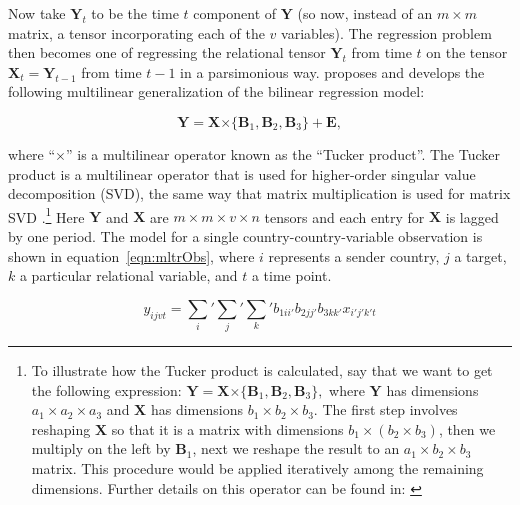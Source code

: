 \documentclass[3p,times,twocolumn,authoryear,12pt]{elsarticle}
\newcommand{\bl}[1]{{\mathbf #1}}
\begin{document}
Now take $\bl Y_t$ to be the time $t$ component of $\bl Y$ (so now, instead of an $m\times m$ matrix, a tensor incorporating each of the $v$ variables). The regression problem then becomes one of regressing the relational tensor $\bl Y_t$ from time $t$ on the tensor $\bl X_t =\bl Y_{t-1}$ from time $t-1$ in a parsimonious way. \citet{hoff:2015} proposes and develops the following multilinear generalization of the bilinear regression model: 

\begin{equation}  
	\bl Y = \bl X \boldsymbol{\times} \{ \bl B_{1}, \bl B_{2}, \bl B_3\} + \bl E ,  
	\label{eqn:mltr}
\end{equation}

\noindent where ``$\boldsymbol{\times}$'' is a multilinear operator known as the ``Tucker product''. The Tucker product is a multilinear operator that is used for higher-order singular value decomposition (SVD), the same way that matrix multiplication is used for matrix SVD \citep{lathauwer:etal:2000, kolda:bader:2009}.\footnote{To illustrate how the Tucker product is calculated, say that we want to get the following expression: $\bl Y = \bl X \boldsymbol{\times} \{ \bl B_{1}, \bl B_{2}, \bl B_{3}\},$ where $\bl Y$ has dimensions $a_{1} \times a_{2} \times a_{3}$ and $\bl X$ has dimensions $b_{1} \times b_{2} \times b_{3}$. The first step involves reshaping $\bl X$ so that it is a matrix with  dimensions $b_{1} \times (b_{2} \times b_{3})$, then we multiply on the left by $\bl B_{1}$, next we reshape the result to an $a_{1} \times b_{2} \times b_{3}$ matrix. This procedure would be applied iteratively among the remaining dimensions. Further details on this operator can be found in: \citet{kolda:2006, hoff:2011}} Here $\bl Y$ and $\bl X$ are $m \times m \times v \times n$ tensors and each entry for $\bl X$ is lagged by one period. The model for a single country-country-variable observation is shown in equation~\ref{eqn:mltrObs}, where $i$ represents a sender country, $j$ a target, $k$ a particular relational variable, and $t$ a time point. 

\begin{equation}  
	y_{ijvt} = \sum_i' \sum_j' \sum_k' b_{1ii'} b_{2jj'} b_{3kk'} x_{i'j'k't}
	\label{eqn:mltrObs}
\end{equation}
\end{document}
